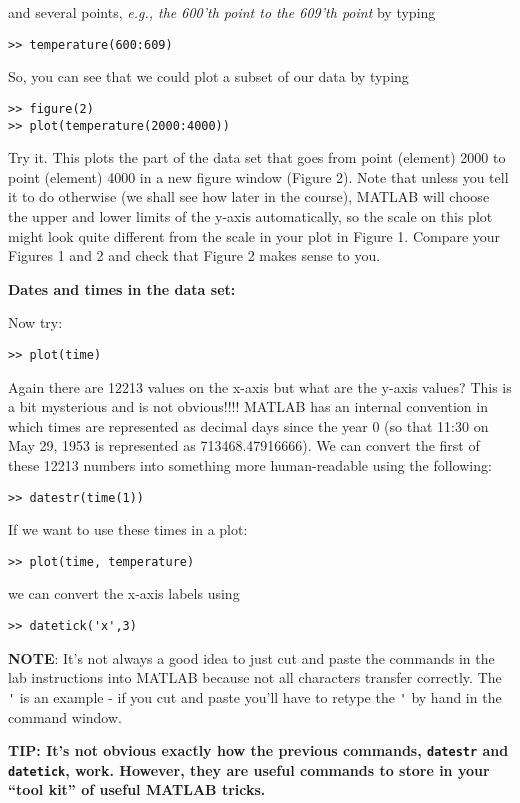 \documentclass[letterpaper]{article}
\begin{document}
and several points, {\it e.g., the 600'th point to the 609'th point} by typing
\begin{verbatim}
>> temperature(600:609)
\end{verbatim}

So, you can see that we could plot a subset of our data by typing
\begin{verbatim}
>> figure(2)
>> plot(temperature(2000:4000))
\end{verbatim}

Try it.  This plots the part of the data set that goes from point (element) 2000 to point (element) 4000
in a new figure window (Figure 2).
Note that unless you tell it to do otherwise (we shall see how later in the course), MATLAB will choose
the upper and lower limits of the y-axis automatically, so the scale on this plot might look quite different from
the scale in your plot in Figure 1.  Compare your Figures 1 and 2 and check that Figure 2 makes sense to you.

\vskip 10pt
{\bf Dates and times in the data set:}

Now try:
\begin{verbatim}
>> plot(time)
\end{verbatim}
Again there are 12213 values on the x-axis but what are the y-axis values?
This is a bit mysterious and is not obvious!!!!  MATLAB has an internal convention in which times are represented as decimal days since
the year 0 (so that 11:30 on May 29, 1953 is represented as 713468.47916666). 
We can convert the first of these 12213 numbers into something more human-readable using
the following:
\begin{verbatim}
>> datestr(time(1))
\end{verbatim}
If we want to use these times in a plot:
\begin{verbatim}
>> plot(time, temperature)
\end{verbatim}
we can convert the x-axis labels using
\begin{verbatim}
>> datetick('x',3)
\end{verbatim}

{\bf NOTE}: It's not always a good idea to just cut and paste the commands in the lab instructions into MATLAB because not all characters transfer correctly.  The \verb+'+  is an example - if you cut and paste you'll have to retype the \verb+'+ by hand in the command window.

{\bf TIP: It's not obvious exactly how the previous commands, \verb+datestr+ and \verb+datetick+, work.  However,  they are useful commands to store in your ``tool kit'' of useful MATLAB tricks.}
 
\end{document}
